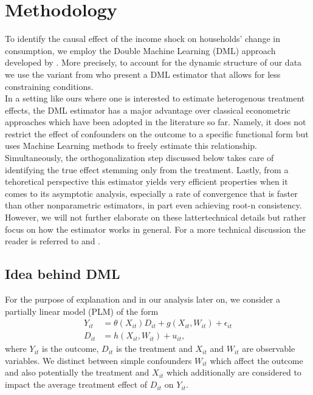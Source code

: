 \section{Methodology}
To identify the causal effect of the income shock on households' change in consumption, we employ the Double Machine Learning (DML) approach developed by \cite{DML2017}. More precisely, to account for the dynamic structure of our data we use the variant from \cite{PanelDML} who present a DML estimator that allows for less constraining conditions. \\ 
In a setting like ours where one is interested to estimate heterogenous treatment effects, the DML estimator has a major advantage over classical econometric approaches which have been adopted in the literature so far. Namely, it does not restrict the effect of confounders on the outcome to a specific functional form but uses Machine Learning methods to freely estimate this relationship. Simultaneously, the orthogonalization step discussed below takes care of identifying the true effect stemming only from the treatment. Lastly, from a tehoretical perspective this estimator yields very efficient properties when it comes to its asymptotic analysis, especially a rate of convergence that is faster than other nonparametric estimators, in part even achieving root-n consistency. However, we will not further elaborate on these lattertechnical details but rather focus on how the estimator works in general. For a more technical discussion the reader is referred to \cite{DML2017} and \cite{PanelDML}. 

\subsection*{Idea behind DML}
For the purpose of explanation and in our analysis later on, we consider a partially linear model (PLM) of the form 
\begin{align}
    Y_{it}&=\theta(X_{it})D_{it}+g(X_{it}, W_{it})+\epsilon_{it} \label{eq:plm1}\\
    D_{it}&=h(X_{it}, W_{it})+u_{it}, \label{eq:plm2}
\end{align}
where $Y_{it}$ is the outcome, $D_{it}$ is the treatment and $X_{it}$ and $W_{it}$ are observable variables. We distinct between simple confounders $W_{it}$ which affect the outcome and also potentially the treatment and $X_{it}$ which additionally are considered to impact the average treatment effect of $D_{it}$ on $Y_{it}$. 